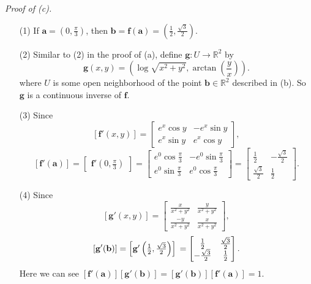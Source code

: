 \documentclass{article}
\begin{document}
\emph{Proof of (c).}
\begin{enumerate}
\item[(1)]
  If $\mathbf{a} = \left(0, \frac{\pi}{3}\right)$, then
  $\mathbf{b} = \mathbf{f}(\mathbf{a}) = \left( \frac{1}{2}, \frac{\sqrt{3}}{2} \right)$.

\item[(2)]
  Similar to (2) in the proof of (a),
  define $\mathbf{g}: U \to \mathbb{R}^2$ by
  \[
    \mathbf{g}(x,y) = \left(\log \sqrt{x^2+y^2}, \arctan\left(\frac{y}{x}\right) \right).
  \]
  where $U$ is some open neighborhood of the point $\mathbf{b} \in \mathbb{R}^2$ described in (b).
  So $\mathbf{g}$ is a continuous inverse of $\mathbf{f}$.

\item[(3)]
  Since
  \[
    [\mathbf{f}'(x,y)]
    =
    \begin{bmatrix}
      e^x \cos y & -e^x \sin y \\
      e^x \sin y &  e^x \cos y
    \end{bmatrix},
  \]
  \[
    [\mathbf{f}'(\mathbf{a})]
    =
    \begin{bmatrix}
      \mathbf{f}'\left(0, \frac{\pi}{3}\right)
    \end{bmatrix}
    =
    \begin{bmatrix}
      e^0 \cos \frac{\pi}{3} & -e^0 \sin \frac{\pi}{3} \\
      e^0 \sin \frac{\pi}{3} &  e^0 \cos \frac{\pi}{3}
    \end{bmatrix}
    =
    \begin{bmatrix}
      \frac{1}{2} & -\frac{\sqrt{3}}{2} \\
      \frac{\sqrt{3}}{2} & \frac{1}{2}
    \end{bmatrix}.
  \]

\item[(4)]
  Since
  \[
    [\mathbf{g}'(x,y)]
    =
    \begin{bmatrix}
      \frac{x}{x^2+y^2} & \frac{y}{x^2+y^2} \\
      \frac{-y}{x^2+y^2} & \frac{x}{x^2+y^2}
    \end{bmatrix},
  \]
  \[
    [\mathbf{g}'(\mathbf{b})]
    =
    \begin{bmatrix}
      \mathbf{g}'\left( \frac{1}{2}, \frac{\sqrt{3}}{2} \right)
    \end{bmatrix} \\
    =
    \begin{bmatrix}
      \frac{1}{2} & \frac{\sqrt{3}}{2} \\
      -\frac{\sqrt{3}}{2} & \frac{1}{2}
    \end{bmatrix}.
  \]
  Here we can see $[\mathbf{f}'(\mathbf{a})][\mathbf{g}'(\mathbf{b})]
  = [\mathbf{g}'(\mathbf{b})][\mathbf{f}'(\mathbf{a})] = 1$.


\end{enumerate}
\end{document}
